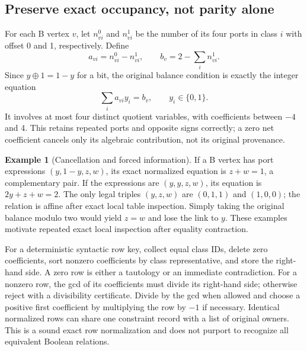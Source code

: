 \documentclass[11pt,letterpaper]{article}
\theoremstyle{definition}
\newtheorem{example}[theorem]{Example}
\newcommand{\bits}{\{0,1\}}
\begin{document}
\subsection{Preserve exact occupancy, not parity alone}
For each B vertex \(v\), let \(n^0_{vi}\) and \(n^1_{vi}\) be the number of its four ports in class \(i\) with offset 0 and 1, respectively. Define
\begin{equation}\label{eq:weighted}
 a_{vi}=n^0_{vi}-n^1_{vi},\qquad
 b_v=2-\sum_i n^1_{vi}.
\end{equation}
Since \(y\oplus1=1-y\) for a bit, the original balance condition is exactly the integer equation
\begin{equation}\label{eq:weightedrow}
 \sum_i a_{vi}y_i=b_v,\qquad y_i\in\bits.
\end{equation}
It involves at most four distinct quotient variables, with coefficients between \(-4\) and 4. This retains repeated ports and opposite signs correctly; a zero net coefficient cancels only its algebraic contribution, not its original provenance.

\begin{example}[Cancellation and forced information]
If a B vertex has port expressions \((y,1-y,z,w)\), its exact normalized equation is \(z+w=1\), a complementary pair. If the expressions are \((y,y,z,w)\), its equation is \(2y+z+w=2\). The only legal triples \((y,z,w)\) are \((0,1,1)\) and \((1,0,0)\); the relation is affine after exact local table inspection. Simply taking the original balance modulo two would yield \(z=w\) and lose the link to \(y\). These examples motivate repeated exact local inspection after equality contraction.
\end{example}

For a deterministic syntactic row key, collect equal class IDs, delete zero coefficients, sort nonzero coefficients by class representative, and store the right-hand side. A zero row is either a tautology or an immediate contradiction. For a nonzero row, the gcd of its coefficients must divide its right-hand side; otherwise reject with a divisibility certificate. Divide by the gcd when allowed and choose a positive first coefficient by multiplying the row by \(-1\) if necessary. Identical normalized rows can share one constraint record with a list of original owners. This is a sound exact row normalization and does not purport to recognize all equivalent Boolean relations.
\end{document}
